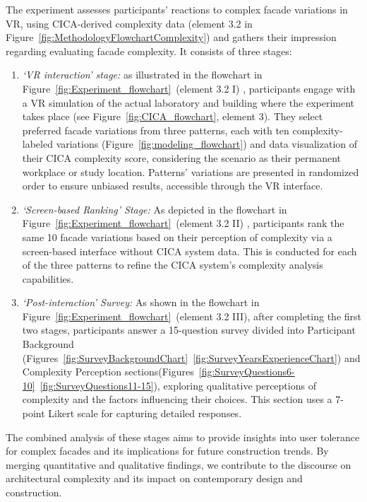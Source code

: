 %    

The experiment assesses participants' reactions to complex facade variations in VR, using CICA-derived complexity data (element 3.2 in Figure~\ref{fig:MethodologyFlowchartComplexity}) and gathers their impression regarding evaluating facade complexity.
It consists of three stages:

\begin{enumerate}
    \item \textit{`VR interaction' stage:}  as illustrated in the flowchart in Figure~\ref{fig:Experiment_flowchart}~(element 3.2 I) , participants engage with a VR simulation of the actual laboratory and building where the experiment takes place  (see Figure~\ref{fig:CICA_flowchart}, element 3). They select preferred facade variations from three patterns, each with ten complexity-labeled variations (Figure~\ref{fig:modeling_flowchart}) and data visualization of their CICA complexity score, considering the scenario as their permanent workplace or study location.
    Patterns' variations are presented in randomized order to ensure unbiased results, accessible through the VR interface.

    \item \textit{`Screen-based Ranking' Stage:} As depicted in the flowchart in Figure~\ref{fig:Experiment_flowchart}~(element 3.2 II) , participants rank the same 10 facade variations based on their perception of complexity via a screen-based interface without CICA system data.
    This is conducted for each of the three patterns to refine the CICA system's complexity analysis capabilities.

    \item \textit{`Post-interaction' Survey:} As shown in the flowchart in Figure~\ref{fig:Experiment_flowchart}~(element 3.2 III), after completing the first two stages, participants answer a 15-question survey divided into Participant Background (Figures~\ref{fig:SurveyBackgroundChart}~\ref{fig:SurveyYearsExperienceChart}) and Complexity Perception sections(Figures~\ref{fig:SurveyQuestions6-10}~\ref{fig:SurveyQuestions11-15}), exploring qualitative perceptions of complexity and the factors influencing their choices.
    This section uses a 7-point Likert scale for capturing detailed responses.
\end{enumerate}


The combined analysis of these stages aims to provide insights into user tolerance for complex facades and its implications for future construction trends.
By merging quantitative and qualitative findings, we contribute to the discourse on architectural complexity and its impact on contemporary design and construction.